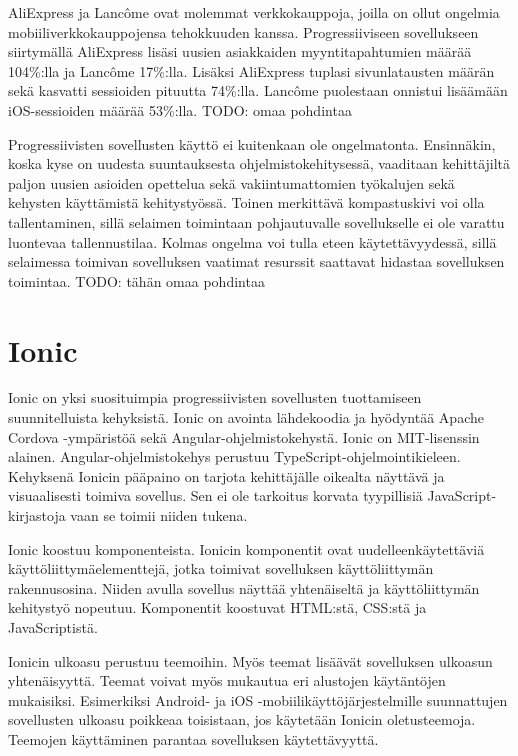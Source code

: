 \documentclass[utf8]{gradu3}
\begin{document}
AliExpress ja Lancôme ovat molemmat verkkokauppoja, joilla on ollut ongelmia mobiiliverkkokauppojensa tehokkuuden kanssa. Progressiiviseen sovellukseen siirtymällä AliExpress lisäsi uusien asiakkaiden myyntitapahtumien määrää 104\%:lla ja Lancôme 17\%:lla. Lisäksi AliExpress tuplasi sivunlatausten määrän sekä kasvatti sessioiden pituutta 74\%:lla. Lancôme puolestaan onnistui lisäämään iOS-sessioiden määrää 53\%:lla. \parencite[]{beginners-guide-pwa}  TODO: omaa pohdintaa

Progressiivisten sovellusten käyttö ei kuitenkaan ole ongelmatonta. Ensinnäkin, koska kyse on uudesta suuntauksesta ohjelmistokehitysessä, vaaditaan kehittäjiltä paljon uusien asioiden opettelua sekä vakiintumattomien työkalujen sekä kehysten käyttämistä kehitystyössä. Toinen merkittävä kompastuskivi voi olla tallentaminen, sillä selaimen toimintaan pohjautuvalle sovellukselle ei ole varattu luontevaa tallennustilaa. Kolmas ongelma voi tulla eteen käytettävyydessä, sillä selaimessa toimivan sovelluksen vaatimat resurssit saattavat hidastaa sovelluksen toimintaa. TODO: tähän omaa pohdintaa \parencite[]{pwa-design-challenges}

\section{Ionic}

Ionic on yksi suosituimpia progressiivisten sovellusten tuottamiseen suunnitelluista kehyksistä. Ionic on avointa lähdekoodia ja hyödyntää Apache Cordova -ympäristöä sekä Angular-ohjelmistokehystä. Ionic on MIT-lisenssin alainen. Angular-ohjelmistokehys perustuu TypeScript-ohjelmointikieleen. Kehyksenä Ionicin pääpaino on tarjota kehittäjälle oikealta näyttävä ja visuaalisesti toimiva sovellus. Sen ei ole tarkoitus korvata tyypillisiä JavaScript-kirjastoja vaan se toimii niiden tukena. \parencite[]{ionic-documentation}

Ionic koostuu komponenteista. Ionicin komponentit ovat uudelleenkäytettäviä käyttöliittymäelementtejä, jotka toimivat sovelluksen käyttöliittymän rakennusosina. Niiden avulla sovellus näyttää yhtenäiseltä ja käyttöliittymän kehitystyö nopeutuu. Komponentit koostuvat HTML:stä, CSS:stä ja JavaScriptistä.

Ionicin ulkoasu perustuu teemoihin. Myös teemat lisäävät sovelluksen ulkoasun yhtenäisyyttä. Teemat voivat myös mukautua eri alustojen käytäntöjen mukaisiksi. Esimerkiksi Android- ja iOS -mobiilikäyttöjärjestelmille suunnattujen sovellusten ulkoasu poikkeaa toisistaan, jos käytetään Ionicin oletusteemoja. Teemojen käyttäminen parantaa sovelluksen käytettävyyttä.
\end{document}
